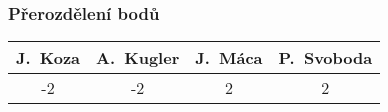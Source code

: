 \documentclass{beamer}
\begin{document}


\begin{frame}[allowframebreaks]\frametitle{Přerozdělení bodů}
    
    \begin{center}
  \begin{tabular}{| c | c | c | c |}
    \hline
     J.~Koza & A.~Kugler & J.~Máca & P.~Svoboda \\
    \hline
     -2 & -2 & 2 & 2 \\
    \hline
  \end{tabular}     
   \end{center}
\end{frame}
\end{document}
